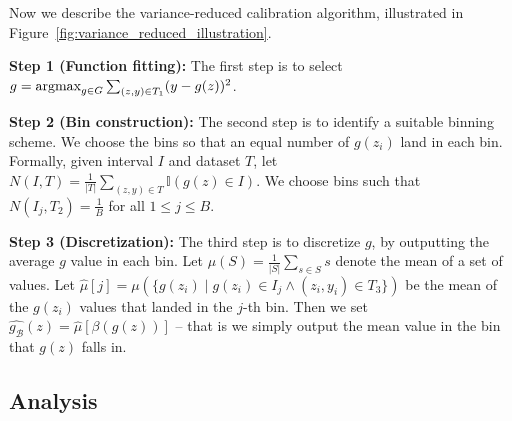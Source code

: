 Now we describe the variance-reduced calibration algorithm, illustrated in Figure~\ref{fig:variance_reduced_illustration}.


\textbf{Step 1 (Function fitting):} The first step is to select $g = \mathop{\mbox{argmax}}_{g \in G} \sum_{(z, y) \in T_1} (y - g(z))^2$.

\textbf{Step 2 (Bin construction):} The second step is to identify a suitable binning scheme. We choose the bins so that an equal number of $g(z_i)$ land in each bin. Formally, given interval $I$ and dataset $T$, let $N(I, T) = \frac{1}{|T|}\sum_{(z, y) \in T} \mathbb{I}(g(z) \in I)$. We choose bins such that  $N(I_j, T_2) = \frac{1}{B}$ for all $1 \leq j \leq B$. 

\textbf{Step 3 (Discretization):} The third step is to discretize $g$, by outputting the average $g$ value in each bin. Let $\mu(S) = \frac{1}{|S|} \sum_{s \in S} s$ denote the mean of a set of values.
Let $\hat{\mu}[j] = \mu(\{ g(z_i) \; | \; g(z_i) \in I_j \wedge (z_i, y_i) \in T_3 \})$ be the mean of the $g(z_i)$ values that landed in the $j$-th bin.
Then we set $\hat{g_{\mathcal{B}}}(z) = \hat{\mu}[\beta(g(z))]$ -- that is we simply output the mean value in the bin that $g(z)$ falls in.


\subsection{Analysis}



